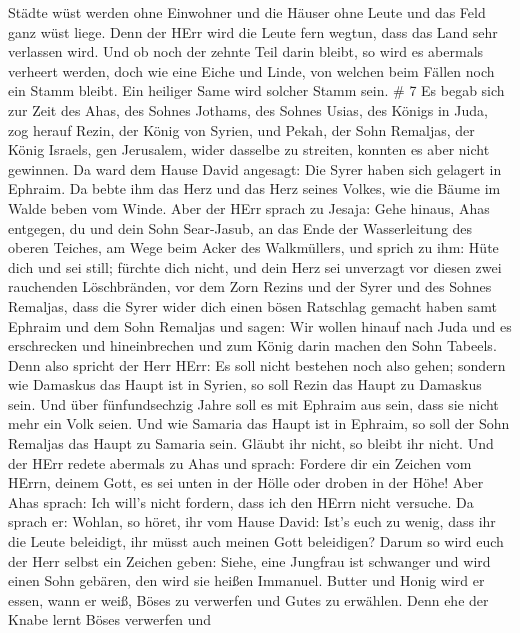 Städte wüst werden ohne Einwohner und die Häuser ohne Leute und das Feld
ganz wüst liege.  Denn der HErr wird die Leute fern wegtun,
dass das Land sehr verlassen wird.  Und ob noch der zehnte
Teil darin bleibt, so wird es abermals verheert werden, doch wie eine
Eiche und Linde, von welchen beim Fällen noch ein Stamm bleibt. Ein
heiliger Same wird solcher Stamm sein. \# 7  Es begab sich
zur Zeit des Ahas, des Sohnes Jothams, des Sohnes Usias, des Königs in
Juda, zog herauf Rezin, der König von Syrien, und Pekah, der Sohn
Remaljas, der König Israels, gen Jerusalem, wider dasselbe zu streiten,
konnten es aber nicht gewinnen.  Da ward dem Hause David
angesagt: Die Syrer haben sich gelagert in Ephraim. Da bebte ihm das
Herz und das Herz seines Volkes, wie die Bäume im Walde beben vom Winde.
 Aber der HErr sprach zu Jesaja: Gehe hinaus, Ahas entgegen,
du und dein Sohn Sear-Jasub, an das Ende der Wasserleitung des oberen
Teiches, am Wege beim Acker des Walkmüllers,  und sprich zu
ihm: Hüte dich und sei still; fürchte dich nicht, und dein Herz sei
unverzagt vor diesen zwei rauchenden Löschbränden, vor dem Zorn Rezins
und der Syrer und des Sohnes Remaljas,  dass die Syrer wider
dich einen bösen Ratschlag gemacht haben samt Ephraim und dem Sohn
Remaljas und sagen:  Wir wollen hinauf nach Juda und es
erschrecken und hineinbrechen und zum König darin machen den Sohn
Tabeels.  Denn also spricht der Herr HErr: Es soll nicht
bestehen noch also gehen;  sondern wie Damaskus das Haupt
ist in Syrien, so soll Rezin das Haupt zu Damaskus sein. Und über
fünfundsechzig Jahre soll es mit Ephraim aus sein, dass sie nicht mehr
ein Volk seien.  Und wie Samaria das Haupt ist in Ephraim,
so soll der Sohn Remaljas das Haupt zu Samaria sein. Gläubt ihr nicht,
so bleibt ihr nicht.  Und der HErr redete abermals zu Ahas
und sprach:  Fordere dir ein Zeichen vom HErrn, deinem
Gott, es sei unten in der Hölle oder droben in der Höhe! 
Aber Ahas sprach: Ich will's nicht fordern, dass ich den HErrn nicht
versuche.  Da sprach er: Wohlan, so höret, ihr vom Hause
David: Ist's euch zu wenig, dass ihr die Leute beleidigt, ihr müsst auch
meinen Gott beleidigen?  Darum so wird euch der Herr selbst
ein Zeichen geben: Siehe, eine Jungfrau ist schwanger und wird einen
Sohn gebären, den wird sie heißen Immanuel.  Butter und
Honig wird er essen, wann er weiß, Böses zu verwerfen und Gutes zu
erwählen.  Denn ehe der Knabe lernt Böses verwerfen und
